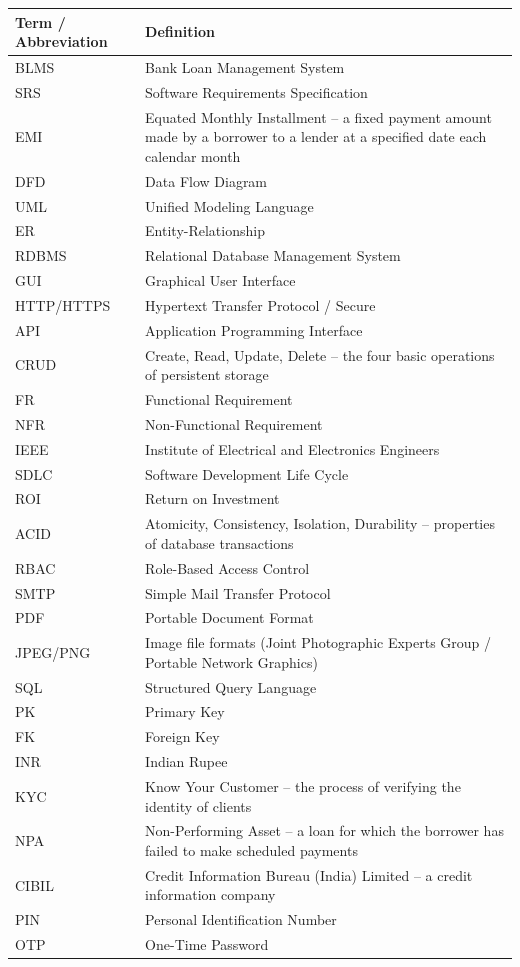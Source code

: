 \documentclass[12pt,a4paper,oneside]{report}
\begin{document}
\begin{table}[htbp]
\centering
\small
\begin{tabularx}{\textwidth}{l l}
\toprule
\textbf{Term / Abbreviation} & \textbf{Definition} \\
\midrule
BLMS & Bank Loan Management System \\
SRS & Software Requirements Specification \\
EMI & Equated Monthly Installment – a fixed payment amount made by a borrower to a lender at a specified date each calendar month \\
DFD & Data Flow Diagram \\
UML & Unified Modeling Language \\
ER & Entity-Relationship \\
RDBMS & Relational Database Management System \\
GUI & Graphical User Interface \\
HTTP/HTTPS & Hypertext Transfer Protocol / Secure \\
API & Application Programming Interface \\
CRUD & Create, Read, Update, Delete – the four basic operations of persistent storage \\
FR & Functional Requirement \\
NFR & Non-Functional Requirement \\
IEEE & Institute of Electrical and Electronics Engineers \\
SDLC & Software Development Life Cycle \\
ROI & Return on Investment \\
ACID & Atomicity, Consistency, Isolation, Durability – properties of database transactions \\
RBAC & Role-Based Access Control \\
SMTP & Simple Mail Transfer Protocol \\
PDF & Portable Document Format \\
JPEG/PNG & Image file formats (Joint Photographic Experts Group / Portable Network Graphics) \\
SQL & Structured Query Language \\
PK & Primary Key \\
FK & Foreign Key \\
INR & Indian Rupee \\
KYC & Know Your Customer – the process of verifying the identity of clients \\
NPA & Non-Performing Asset – a loan for which the borrower has failed to make scheduled payments \\
CIBIL & Credit Information Bureau (India) Limited – a credit information company \\
PIN & Personal Identification Number \\
OTP & One-Time Password \\
\bottomrule
\end{tabularx}
\end{table}
\end{document}
